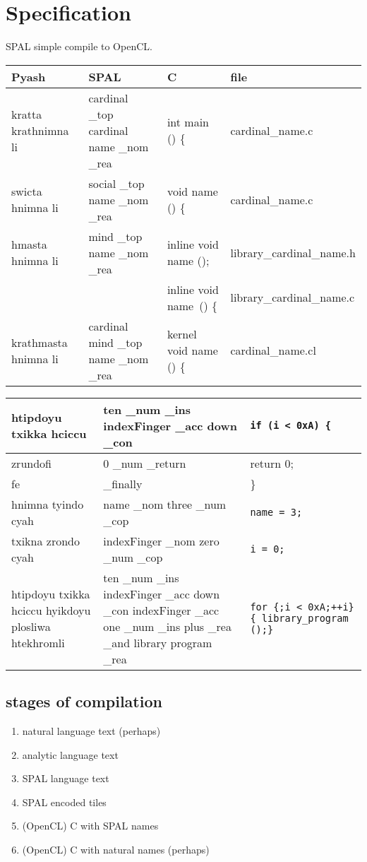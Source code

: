 \chapter{Specification}
SPAL simple compile to OpenCL.\@

\begin{sidewaystable}
\begin{tabulary}{\textwidth}{L|L|L|L}
Pyash & SPAL & C & file \\
\midrule 
\midrule 
kratta krathnimna li &
cardinal  \_top cardinal name \_nom \_rea & int main () \{ & 
cardinal\_name.c \\
\midrule
swicta hnimna li &
social \_top name \_nom \_rea & void name () \{ & cardinal\_name.c \\
\midrule
hmasta hnimna li&
mind \_top name \_nom \_rea & inline void name (); &
library\_cardinal\_name.h \\
& & inline void name\ () \{ & library\_cardinal\_name.c \\
\midrule
krathmasta hnimna li &
cardinal mind \_top name \_nom \_rea & kernel void name () \{ &
cardinal\_name.cl \\
\end{tabulary}
\begin{tabulary}{\textwidth}{L|L|L}
\toprule
htipdoyu txikka hciccu &
ten \_num \_ins indexFinger \_acc down \_con & \texttt{if (i < 0xA) \{} \\
\midrule 
zrundofi  & 
0 \_num \_return & return 0; \\
\midrule
fe & 
\_finally & \} \\
\midrule
hnimna tyindo cyah &
name \_nom three \_num \_cop & \texttt{name = 3;} \\
\midrule 
txikna zrondo cyah &
indexFinger \_nom zero \_num \_cop & \texttt{i = 0;} \\
\midrule 
htipdoyu txikka hciccu hyikdoyu plosliwa htekhromli&
ten \_num \_ins indexFinger \_acc down \_con 
indexFinger \_acc one \_num \_ins plus \_rea \_and library program \_rea & 
\texttt{for \{;i < 0xA;\@ ++i\}\{ library\_program ();\}}  \\
\end{tabulary}
\end{sidewaystable}


\section{stages of compilation}

\begin{enumerate}
  \item natural language text (perhaps)
  \item analytic language text
  \item SPAL language text
  \item SPAL encoded tiles
  \item (OpenCL) C with SPAL names
  \item (OpenCL) C with natural names (perhaps)
\end{enumerate}

